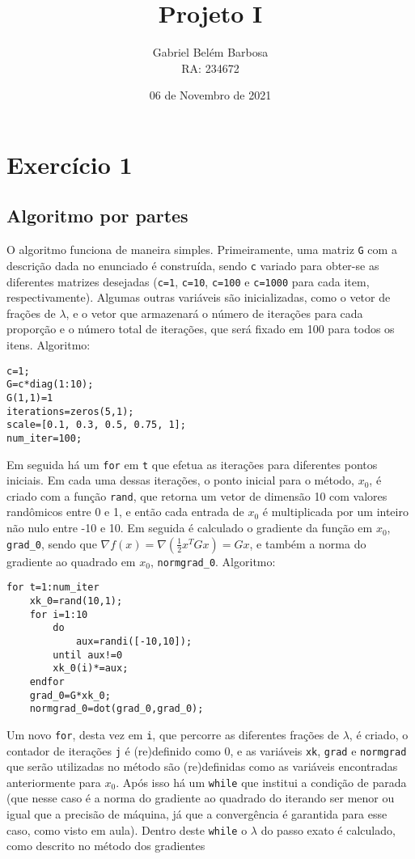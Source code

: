 \documentclass[a4paper, 12pt]{article}
\begin{document}
\title{\Large{\textbf{Projeto I}}}
\author{
        Gabriel Belém Barbosa \\RA: 234672
}
\date{06 de Novembro de 2021}

\maketitle
\let\cleardoublepage\clearpage
\newpage
\setcounter{page}{2}
\tableofcontents
\newpage
\section{Exercício 1}


\subsection{Algoritmo por partes}
O algoritmo funciona de maneira simples. Primeiramente, uma matriz \verb+G+ com a descrição dada no enunciado é construída, sendo \verb+c+ variado para obter-se as diferentes matrizes desejadas (\verb+c=1+, \verb+c=10+, \verb+c=100+ e \verb+c=1000+ para cada item, respectivamente). Algumas outras variáveis são inicializadas, como o vetor de frações de $\lambda$, e o vetor que armazenará o número de iterações para cada proporção e o número total de iterações, que será fixado em 100 para todos os itens. Algoritmo:
\begin{lstlisting}
c=1;
G=c*diag(1:10);
G(1,1)=1
iterations=zeros(5,1);
scale=[0.1, 0.3, 0.5, 0.75, 1];
num_iter=100;
\end{lstlisting}
Em seguida há um \verb+for+ em \verb+t+ que efetua as iterações para diferentes pontos iniciais. Em cada uma dessas iterações, o ponto inicial para o método, $x_0$, é criado com a função \verb+rand+, que retorna um vetor de dimensão 10 com valores randômicos entre 0 e 1, e então cada entrada de $x_0$ é multiplicada por um inteiro não nulo entre -10 e 10. Em seguida é calculado o gradiente da função em $x_0$, \verb+grad_0+, sendo que $\nabla f(x) =\nabla\left( \frac{1}{2}x^TGx\right)=Gx$, e também a norma do gradiente ao quadrado em $x_0$,  \verb+normgrad_0+. Algoritmo:
\begin{lstlisting}
for t=1:num_iter
    xk_0=rand(10,1);
    for i=1:10
        do
            aux=randi([-10,10]);
        until aux!=0
        xk_0(i)*=aux;
    endfor
    grad_0=G*xk_0;
    normgrad_0=dot(grad_0,grad_0);
\end{lstlisting}
Um novo \verb+for+, desta vez em \verb+i+, que percorre as diferentes frações de $\lambda$, é criado, o contador de iterações \verb+j+ é (re)definido como 0, e as variáveis \verb+xk+,  \verb+grad+ e  \verb+normgrad+ que serão utilizadas no método são (re)definidas como as variáveis encontradas anteriormente para $x_0$. Após isso há um \verb+while+ que institui a condição de parada (que nesse caso é a norma do gradiente ao quadrado do iterando ser menor ou igual que a precisão de máquina, já que a convergência é garantida para esse caso, como visto em aula). Dentro deste \verb+while+ o $\lambda$ do passo exato é calculado, como descrito no método dos gradientes
\end{document}
